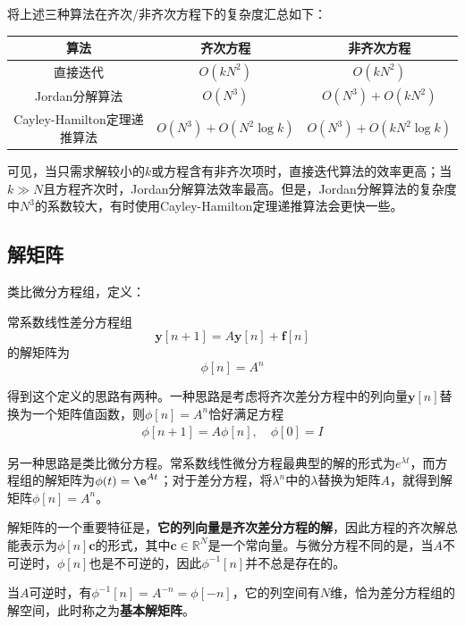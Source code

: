 将上述三种算法在齐次/非齐次方程下的复杂度汇总如下：
\begin{table}[h]
    \centering
    \begin{tabular}{|c|c|c|}
        \hline
        算法 & 齐次方程 & 非齐次方程 \\
        \hline
        直接迭代 & $O(k N^2)$ & $O(k N^2)$ \\
        \hline
        Jordan分解算法 & $O(N^3)$ & $O(N^3)+O(k N^2)$ \\
        \hline
        Cayley-Hamilton定理递推算法 & $O(N^3)+O(N^2 \log k)$ & $O(N^3)+O(k N^2 \log k)$ \\
        \hline
    \end{tabular}
\end{table}

可见，当只需求解较小的$k$或方程含有非齐次项时，直接迭代算法的效率更高；当$k\gg N$且方程齐次时，Jordan分解算法效率最高。但是，Jordan分解算法的复杂度中$N^3$的系数较大，有时使用Cayley-Hamilton定理递推算法会更快一些。

\subsection{解矩阵}\label{sub:fundamental_solution_matrix}

类比微分方程组，定义：
\begin{definition}[解矩阵]
    常系数线性差分方程组
    $$\mathbf{y}[n+1] = A \mathbf{y}[n] + \mathbf{f}[n]$$
    的解矩阵为
    $$\phi[n]=A^n$$
\end{definition}

得到这个定义的思路有两种。一种思路是考虑将齐次差分方程中的列向量$\mathbf{y}[n]$替换为一个矩阵值函数，则$\phi[n]=A^n$恰好满足方程\begin{align*}
    \phi[n+1] = A \phi[n],\quad \phi[0] = I
\end{align*}

另一种思路是类比微分方程。常系数线性微分方程最典型的解的形式为$e^{\lambda t}$，而方程组的解矩阵为$\phi(t)=\e^{At}$；对于差分方程，将$\lambda^n$中的$\lambda$替换为矩阵$A$，就得到解矩阵$\phi[n]=A^n$。

解矩阵的一个重要特征是，\textbf{它的列向量是齐次差分方程的解}，因此方程的齐次解总能表示为$\phi[n]\mathbf{c}$的形式，其中$\mathbf{c}\in\mathbb{R}^N$是一个常向量。与微分方程不同的是，当$A$不可逆时，$\phi[n]$也是不可逆的，因此$\phi^{-1}[n]$并不总是存在的。

当$A$可逆时，有$\phi^{-1}[n] = A^{-n}=\phi[-n]$，它的列空间有$N$维，恰为差分方程组的解空间，此时称之为\textbf{基本解矩阵}。

